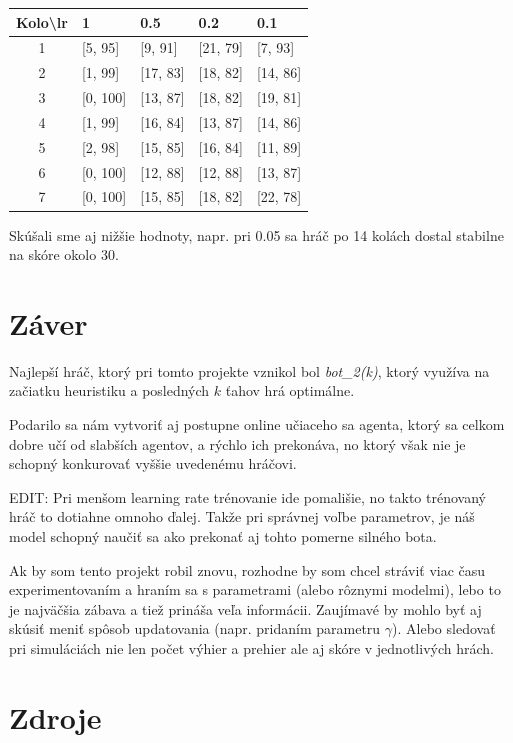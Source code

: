 \documentclass[10pt,a4paper]{article}
\begin{document}
\noindent
\begin{tabular}{c|llll}
\textbf{Kolo\textbackslash lr}	
	& 1					& 0.5						& 0.2						& 0.1 	\\ \hline

1	&		[5, 95]		&		[9, 91]				&		[21, 79]			&	[7, 93]			\\
2	&		[1, 99]		&		[17, 83]			&		[18, 82]			&	[14, 86]			\\
3	&		[0, 100]	&		[13, 87]			&		[18, 82]			&	[19, 81]			\\
4	&		[1, 99]		&		[16, 84]			&		[13, 87]			&	[14, 86]			\\	
5	&		[2, 98]		&		[15, 85]			&		[16, 84]			&	 [11, 89]			\\
6	&		[0, 100]	&		[12, 88]			&		[12, 88]			&	 [13, 87]			\\
7	&		[0, 100]	&		[15, 85]			&		[18, 82]			&	 [22, 78]			

\end{tabular}
\bigskip

Skúšali sme aj nižšie hodnoty, napr. pri 0.05 sa hráč po 14 kolách dostal stabilne na skóre okolo 30.


\section{Záver} 

Najlepší hráč, ktorý pri tomto projekte vznikol bol \textit{bot\_2(k)}, ktorý využíva na začiatku heuristiku a posledných $k$ ťahov hrá optimálne.

Podarilo sa nám vytvoriť aj postupne online učiaceho sa agenta, ktorý sa celkom dobre učí od slabších agentov, a rýchlo ich prekonáva, no ktorý však nie je schopný konkurovať vyššie uvedenému hráčovi. 

\bigskip

EDIT: Pri menšom learning rate trénovanie ide pomališie, no takto trénovaný hráč to dotiahne omnoho ďalej. Takže pri správnej voľbe parametrov, je náš model schopný naučiť sa ako prekonať aj tohto pomerne silného bota.

Ak by som tento projekt robil znovu, rozhodne by som chcel stráviť viac času experimentovaním a hraním sa s parametrami (alebo rôznymi modelmi), 
lebo to je najväčšia zábava a tiež prináša veľa informácii. Zaujímavé by mohlo byť aj skúsiť meniť spôsob updatovania (napr. pridaním parametru $\gamma$).
Alebo sledovať pri simuláciách nie len počet výhier a prehier ale aj skóre v jednotlivých hrách.

\section*{Zdroje}
\end{document}
